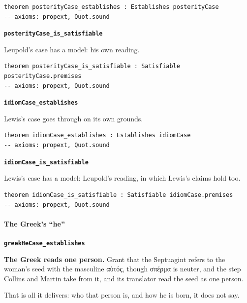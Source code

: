 \documentclass[11pt]{article}
\begin{document}
{\small\begin{verbatim}
theorem posterityCase_establishes : Establishes posterityCase
-- axioms: propext, Quot.sound
\end{verbatim}}
\par\medskip\noindent\textbf{\texttt{posterity\allowbreak{}Case\_\allowbreak{}is\_\allowbreak{}satisfiable}}\par\nobreak\noindent
Leupold’s case has a model: his own reading.

{\small\begin{verbatim}
theorem posterityCase_is_satisfiable : Satisfiable posterityCase.premises
-- axioms: propext, Quot.sound
\end{verbatim}}
\par\medskip\noindent\textbf{\texttt{idiom\allowbreak{}Case\_\allowbreak{}establishes}}\par\nobreak\noindent
Lewis’s case goes through on its own grounds.

{\small\begin{verbatim}
theorem idiomCase_establishes : Establishes idiomCase
-- axioms: propext, Quot.sound
\end{verbatim}}
\par\medskip\noindent\textbf{\texttt{idiom\allowbreak{}Case\_\allowbreak{}is\_\allowbreak{}satisfiable}}\par\nobreak\noindent
Lewis’s case has a model: Leupold’s reading, in which Lewis’s claims hold too.

{\small\begin{verbatim}
theorem idiomCase_is_satisfiable : Satisfiable idiomCase.premises
-- axioms: propext, Quot.sound
\end{verbatim}}
\paragraph*{The Greek’s “he”}
\leavevmode\par\nobreak
\par\medskip\noindent\textbf{\texttt{greek\allowbreak{}He\allowbreak{}Case\_\allowbreak{}establishes}}\par\nobreak\noindent
\textbf{The Greek reads one person.} Grant that the Septuagint refers to the woman’s seed with the masculine αὐτός, though σπέρμα is neuter, and the step Collins and Martin take from it, and its translator read the seed as one person.

That is all it delivers: who that person is, and how he is born, it does not say.
\end{document}
